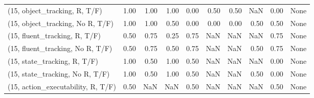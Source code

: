\begin{table*}[h!]
\begin{adjustbox}{width=2\columnwidth,center}
\begin{tabular}{lrrr|rrr|rrr}
\midrule
(15, object\_tracking, R, T/F)         &                      1.00 &                  1.00 &                      1.00 &                          0.00 &                      0.50 &                          0.50 &                                    NaN &                               0.00 &                                  None \\
(15, object\_tracking, No R, T/F)      &                      1.00 &                  1.00 &                      0.50 &                          0.00 &                      0.00 &                          0.00 &                                   0.50 &                               0.50 &                                  None \\
(15, fluent\_tracking, R, T/F)         &                      0.50 &                  0.75 &                      0.25 &                          0.75 &                       NaN &                           NaN &                                    NaN &                               0.75 &                                  None \\
(15, fluent\_tracking, No R, T/F)      &                      0.50 &                  0.75 &                      0.50 &                          0.75 &                       NaN &                           NaN &                                   0.50 &                               0.75 &                                  None \\
(15, state\_tracking, R, T/F)          &                      1.00 &                  0.50 &                      1.00 &                          0.50 &                       NaN &                           NaN &                                    NaN &                               0.00 &                                  None \\
(15, state\_tracking, No R, T/F)       &                      1.00 &                  0.50 &                      1.00 &                          0.50 &                       NaN &                           NaN &                                   0.50 &                               0.00 &                                  None \\
(15, action\_executability, R, T/F)    &                      0.50 &                   NaN &                       NaN &                          0.50 &                       NaN &                           NaN &                                    NaN &                               0.50 &                                  None \\

\end{tabular}
\end{adjustbox}
\end{table*}
